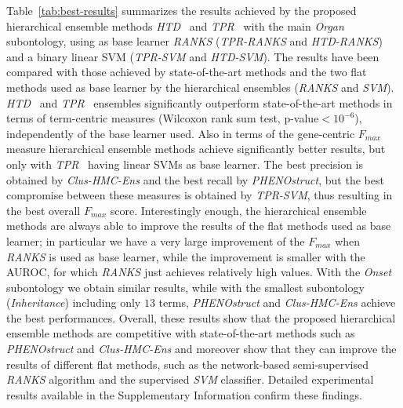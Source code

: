 \documentclass{bioinfo}
\newcommand{\htd}{{\em HTD}}
\newcommand{\tpr}{{\em TPR}}
\begin{document}
Table~\ref{tab:best-results} summarizes the results achieved by the proposed hierarchical ensemble methods \htd~ and \tpr~ with the main {\em Organ} subontology, using as base learner \textsl{RANKS}  (\textsl{TPR-RANKS} and \textsl{HTD-RANKS}) and a binary linear SVM (\textsl{TPR-SVM} and \textsl{HTD-SVM}). The results have been compared with those achieved by state-of-the-art methods and the two flat methods used as base learner by the hierarchical ensembles (\textsl{RANKS} and \textsl{SVM}).
\htd~ and \tpr~ ensembles significantly outperform state-of-the-art methods in terms of term-centric measures (Wilcoxon rank sum test, p-value$<10^{-6}$), independently of the base learner used. 
Also in terms of the gene-centric $F_{max}$ measure hierarchical ensemble methods achieve significantly better results, but only with \tpr~ having linear SVMs as base learner.
The best precision is obtained by \textsl{Clus-HMC-Ens} and the best recall by \textsl{PHENOstruct}, but the best compromise between these measures is obtained by  \textsl{TPR-SVM}, thus resulting in the best overall $F_{max}$ score. Interestingly enough, the hierarchical ensemble methods are always able to improve the results of the flat methods used as base learner; in particular we have a very large improvement of the $F_{max}$ when \textsl{RANKS} is used as base learner, while the improvement is smaller with the AUROC, for which \textsl{RANKS} just achieves relatively high values. With the {\em Onset} subontology we obtain similar results, while with the smallest  subontology ({\em Inheritance}) including only $13$ terms, \textsl{PHENOstruct} and \textsl{Clus-HMC-Ens} achieve the best performances.
Overall, these results show that the proposed hierarchical ensemble methods are competitive with state-of-the-art methods such as \textsl{PHENOstruct} and \textsl{Clus-HMC-Ens} and moreover show that they can improve the results of different flat methods, such as the network-based semi-supervised \textsl{RANKS} algorithm and the supervised \textsl{SVM} classifier.
Detailed experimental results available in the Supplementary Information confirm these findings.
																										   

\end{document}
